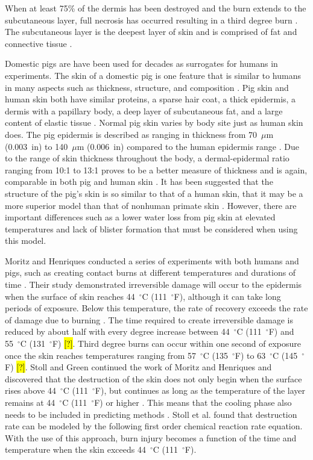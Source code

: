 \documentclass[12pt,oneside]{book}
\begin{document}
When at least 75\% of the dermis has been destroyed and the burn extends to the subcutaneous layer, full necrosis has occurred resulting in a third degree burn \cite{Purser_Toxicity_Heat}. The subcutaneous layer is the deepest layer of skin and is comprised of fat and connective tissue \cite{Hummel_Barker_Lyons}.

Domestic pigs are have been used for decades as surrogates for humans in experiments. The skin of a domestic pig is one feature that is similar to humans in many aspects such as thickness, structure, and composition \cite{Time_Temperature_Cutaneous_Burns}. Pig skin and human skin both have similar proteins, a sparse hair coat, a thick epidermis, a dermis with a papillary body, a deep layer of subcutaneous fat, and a large content of elastic tissue \cite{Of_pigs_and_men}. Normal pig skin varies by body site just as human skin does. The pig epidermis is described as ranging in thickness from 70~$\mu$m (0.003~in) to 140~$\mu$m (0.006~in) compared to the human epidermis range \cite{Pig_Experimental_model}. Due to the range of skin thickness throughout the body, a dermal-epidermal ratio ranging from 10:1 to 13:1 proves to be a better measure of thickness and is again, comparable in both pig and human skin \cite{Pigs_Wound_Healing}.  It has been suggested that the structure of the pig's skin is so similar to that of a human skin, that it may be a more{} superior model than that of nonhuman primate skin \cite{Sensitivity_Cross-reacting}. However, there are important differences such as a lower water loss from pig skin at elevated temperatures and lack of blister formation that must be considered when using this model.

Moritz and Henriques conducted a series of experiments with both humans and pigs, such as creating contact burns at different temperatures and durations of time \cite{Time_Temperature_Cutaneous_Burns}. Their study demonstrated irreversible damage will occur to the epidermis when the surface of skin reaches 44~$^\circ$C (111~$^\circ$F), although it can take long periods of exposure. Below this temperature, the rate of recovery exceeds the rate of damage due to burning \cite{Thermal_Electronic}. The time required to create irreversible damage is reduced by about half with every degree increase between 44~$^\circ$C (111~$^\circ$F) and 55~$^\circ$C (131~$^\circ$F) \cite{Thermal_Electronic}\hl{[?]}. Third degree burns can occur within one second of exposure once the skin reaches temperatures ranging from 57~$^\circ$C (135~$^\circ$F) to 63~$^\circ$C (145~$^\circ$F) \cite{Thermal_Electronic}\hl{[?]}. Stoll and Green continued the work of Moritz and Henriques and discovered that the destruction of the skin does not only begin when the surface rises above 44~$^\circ$C (111~$^\circ$F), but continues as long as the temperature of the layer remains at 44~$^\circ$C (111~$^\circ$F) or higher \cite{Pain_Thermal_Radiation}. This means that the cooling phase also needs to be included in pred{}i{}cting methods \cite{Standard_Manikin}. Stoll et al. found that destruction rate can be modeled by the following first order chemical reaction rate equation.  With the use of this approach, burn injury becomes a function of the time and temperature when the skin exceeds 44~$^\circ$C (111~$^\circ$F). 
\end{document}
